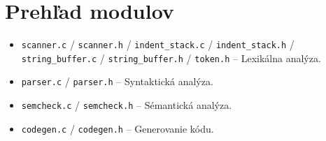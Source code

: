 \section{Prehľad modulov}
\begin{itemize}
    \item \texttt{scanner.c} / \texttt{scanner.h} / \texttt{indent\_stack.c} / \texttt{indent\_stack.h} / \texttt{string\_buffer.c} / \texttt{string\_buffer.h} / \texttt{token.h} -- Lexikálna analýza.
    \item \texttt{parser.c} / \texttt{parser.h} -- Syntaktická analýza.
    \item \texttt{semcheck.c} / \texttt{semcheck.h} -- Sémantická analýza.
    \item \texttt{codegen.c} / \texttt{codegen.h} -- Generovanie kódu.
\end{itemize}